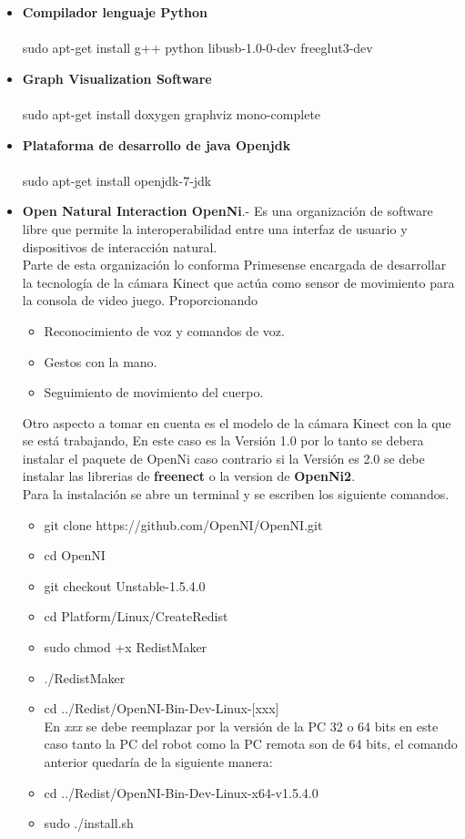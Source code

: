 \documentclass[12pt,a4paper]{article}
\begin{document}
\begin{itemize}
\item \textbf{Compilador lenguaje Python}\\\\
sudo apt-get install g++ python libusb-1.0-0-dev freeglut3-dev
\item \textbf{Graph Visualization Software}\\\\
sudo apt-get install doxygen graphviz mono-complete 
\item \textbf{Plataforma de desarrollo de java Openjdk}\\\\
sudo apt-get install openjdk-7-jdk
\item \textbf{Open Natural Interaction OpenNi}.- Es una organización de software libre que permite la interoperabilidad entre una interfaz de usuario y dispositivos de interacción natural. \\
Parte de esta organización lo conforma Primesense encargada de desarrollar la tecnología de la cámara Kinect que actúa como sensor de movimiento para la consola de video juego. Proporcionando 
\begin{itemize}
\item Reconocimiento de voz y comandos de voz.
\item Gestos con la mano.
\item Seguimiento de movimiento del cuerpo.
\end{itemize}	
Otro aspecto a tomar en cuenta es el modelo de la cámara Kinect con la que se está trabajando, En este caso es la Versión 1.0 por lo tanto se debera instalar el paquete de OpenNi caso contrario si la Versión es 2.0 se debe instalar las librerias de \textbf{freenect} o  la version de \textbf{OpenNi2}.\\
Para la instalación se abre un terminal y se escriben los siguiente comandos.
\begin{itemize}
\item git clone https://github.com/OpenNI/OpenNI.git
\item cd OpenNI
\item git checkout Unstable-1.5.4.0
\item cd Platform/Linux/CreateRedist
\item sudo chmod +x RedistMaker
\item ./RedistMaker
\item cd ../Redist/OpenNI-Bin-Dev-Linux-[xxx]\\
En \textit{xxx} se debe reemplazar por la versión de la PC 32 o 64 bits en este caso tanto la PC del robot como la PC remota son de 64 bits, el comando anterior quedaría de la siguiente manera:
\item cd ../Redist/OpenNI-Bin-Dev-Linux-x64-v1.5.4.0
\item sudo ./install.sh
\end{itemize}


\end{itemize}
\end{document}
